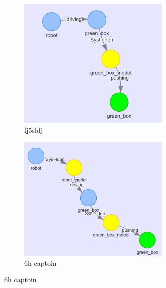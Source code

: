 \begin{figure}[H]
    \begin{subfigure}{.49\textwidth}
    \centering
    \includegraphics[width=0.8\textwidth]{figures/example_hyp_graph/4}
    \caption{fj5sldj}%
    \end{subfigure}
    \hfill
    \begin{subfigure}{.49\textwidth}
    \centering
    \includegraphics[width=0.8\textwidth]{figures/example_hyp_graph/5}
    \caption{6h captoin}%
    \end{subfigure}


\end{figure}
